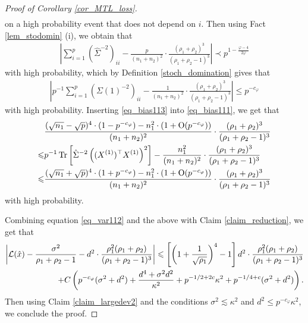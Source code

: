 \begin{proof}[Proof of Corollary \ref{cor_MTL_loss}]
\begin{align*}
\end{align*}
on a high probability event that does not depend on $i$. Then using Fact \ref{lem_stodomin} (i), we obtain that 
\begin{align*} 
\left| \sum_{i=1}^p \left(\hat\Sigma^{-2}\right)_{ii} - \frac{p}{(n_1+n_2)^2}\cdot \frac{(\rho_1+\rho_2)^3}{(\rho_1+\rho_2-1)^3}\right|\prec p^{1-\frac{\varphi-4}{2\varphi}}
\end{align*}
with high probability, which by Definition \ref{stoch_domination} gives that
\begin{align}\label{eq_bias113}
\left| p^{-1}\sum_{i=1}^p \left(\Sigma(1)^{-2}\right)_{ii} - \frac{1}{(n_1+n_2)^2}\cdot \frac{(\rho_1+\rho_2)^3}{(\rho_1+\rho_2-1)^3}\right|\le p^{-c_\varphi}
\end{align}
with high probability. Inserting \eqref{eq_bias113} into \eqref{eq_bias111}, we get that
\begin{align*}
		& \frac{(\sqrt{n_1}-\sqrt{p})^4 \cdot (1- p^{-c_\varphi}) - n_1^2 \cdot (1+\OO(p^{-c_\varphi}))}{(n_1+n_2)^2}\cdot  \frac{(\rho_1+\rho_2)^3}{(\rho_1+\rho_2-1)^3}\nonumber \\
		\le &  {p}^{-1}\tr\left[\hat\Sigma^{-2} \left((X^{(1)})^\top X^{(1)} \right)^2\right] - \frac{n_1^2}{(n_1+n_2)^2}\cdot  \frac{(\rho_1+\rho_2)^3}{(\rho_1+\rho_2-1)^3} \nonumber\\
		\le &  \frac{(\sqrt{n_1}+\sqrt{p})^4 \cdot (1+ p^{-c_\varphi}) - n_1^2 \cdot (1+\OO(p^{-c_\varphi}))}{(n_1+n_2)^2}\cdot  \frac{(\rho_1+\rho_2)^3}{(\rho_1+\rho_2-1)^3}
\end{align*}
with high probability. 

Combining equation \eqref{eq_var112} and the above with Claim \ref{claim_reduction}, we get that
\begin{align*}
	\left|\cal L(\hat x)- \frac{\sigma^2}{\rho_1+\rho_2-1} - d^2\cdot \frac{\rho_1^2 (\rho_1+\rho_2)}{(\rho_1 + \rho_2 - 1)^3}\right| \le   \left[\left( 1+\frac{1}{\sqrt{\rho_1}}\right)^4-1\right] d^2\cdot \frac{\rho_1^2 (\rho_1+\rho_2)}{(\rho_1 + \rho_2 - 1)^3} \nonumber\\
+C\left( p^{-c_\varphi} (\sigma^2 + d^2)+ \frac{d^4 + \sigma^2 d^2}{\kappa^2}+p^{-1/2+2c}\kappa^2 +  p^{-1/4+c} (\sigma^2 +d^2) \right).
\end{align*}
Then using Claim \ref{claim_largedev2} and the conditions $\sigma^2 \lesssim  \kappa^2$ and $d^2 \le p^{-c_{\varphi}}{\kappa^2}$, we conclude the proof.
\end{proof}
